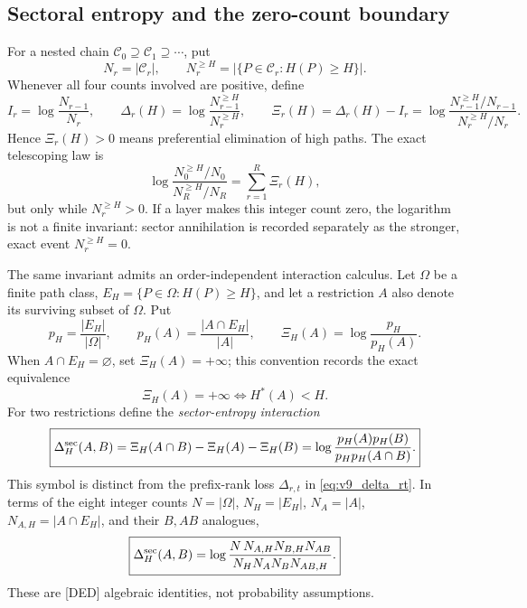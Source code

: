 \documentclass[11pt]{amsart}
\numberwithin{equation}{section}
\theoremstyle{plain}
\theoremstyle{definition}
\theoremstyle{remark}
\begin{document}
\subsection{Sectoral entropy and the zero-count boundary}

For a nested chain $\mathcal C_0\supseteq\mathcal C_1\supseteq\cdots$, put
\begin{equation}
N_r=|\mathcal C_r|,
\qquad
N_r^{\ge H}=|\{P\in\mathcal C_r:H(P)\ge H\}|.
\label{eq:v9_sector_counts}
\end{equation}
Whenever all four counts involved are positive, define
\begin{equation}
I_r=\log\frac{N_{r-1}}{N_r},\qquad
\Delta_r(H)=\log\frac{N_{r-1}^{\ge H}}{N_r^{\ge H}},\qquad
\boxed{\Xi_r(H)=\Delta_r(H)-I_r
=\log\frac{N_{r-1}^{\ge H}/N_{r-1}}{N_r^{\ge H}/N_r}}.
\label{eq:v9_sector_xi}
\end{equation}
Hence $\Xi_r(H)>0$ means preferential elimination of high paths.  The exact
telescoping law is
\begin{equation}
\log\frac{N_0^{\ge H}/N_0}{N_R^{\ge H}/N_R}
=\sum_{r=1}^{R}\Xi_r(H),
\label{eq:v9_sector_telescope}
\end{equation}
but only while $N_r^{\ge H}>0$.  If a layer makes this integer count zero, the
logarithm is not a finite invariant: sector annihilation is recorded separately
as the stronger, exact event $N_r^{\ge H}=0$.

The same invariant admits an order-independent interaction calculus.  Let
$\Omega$ be a finite path class, $E_H=\{P\in\Omega:H(P)\ge H\}$, and let a
restriction $A$ also denote its surviving subset of $\Omega$.  Put
\begin{equation}
p_H=\frac{|E_H|}{|\Omega|},\qquad
p_H(A)=\frac{|A\cap E_H|}{|A|},\qquad
\Xi_H(A)=\log\frac{p_H}{p_H(A)}.
\label{eq:v9_global_sector_gain}
\end{equation}
When $A\cap E_H=\varnothing$, set $\Xi_H(A)=+\infty$; this convention records
the exact equivalence
\begin{equation}
\Xi_H(A)=+\infty\iff H^*(A)<H.
\label{eq:v9_infinite_sector_gain}
\end{equation}
For two restrictions define the \emph{sector-entropy interaction}
\begin{equation}
\boxed{
\Delta_H^{\rm sec}(A,B)
=\Xi_H(A\cap B)-\Xi_H(A)-\Xi_H(B)
=\log\frac{p_H(A)p_H(B)}{p_Hp_H(A\cap B)}.}
\label{eq:v9_sector_interaction}
\end{equation}
This symbol is distinct from the prefix-rank loss $\Delta_{r,t}$ in
\eqref{eq:v9_delta_rt}.  In terms of the eight integer counts
$N=|\Omega|$, $N_H=|E_H|$, $N_A=|A|$, $N_{A,H}=|A\cap E_H|$, and their
$B,AB$ analogues,
\begin{equation}
\boxed{
\Delta_H^{\rm sec}(A,B)=
\log\frac{N\,N_{A,H}N_{B,H}N_{AB}}
{N_HN_AN_BN_{AB,H}}.}
\label{eq:v9_eight_count_delta}
\end{equation}
These are \textup{[DED]} algebraic identities, not probability assumptions.
\end{document}
